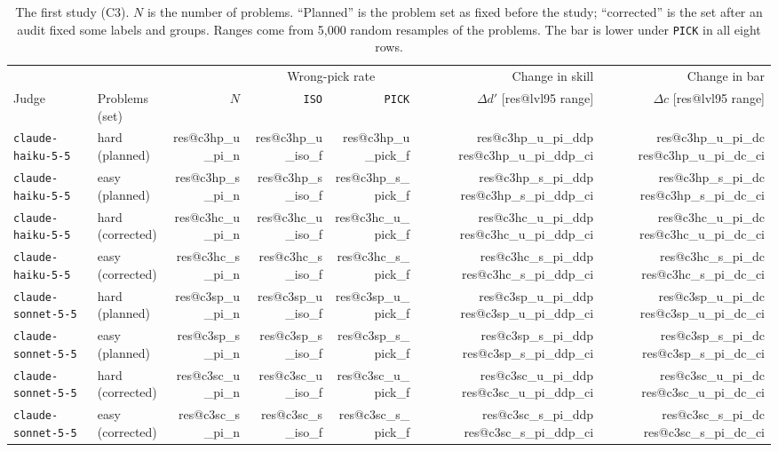 \documentclass[10pt,twocolumn]{article}
\makeatletter
\newcommand{\res}[1]{\csname res@#1\endcsname}
\makeatother
\begin{document}
\begin{table}[t]
\centering\footnotesize
\setlength{\tabcolsep}{4.5pt}
\begin{tabular}{llrrrrr}
\toprule
 & & & \multicolumn{2}{c}{Wrong-pick rate} & Change in skill & Change in bar \\
Judge & Problems (set) & $N$ & \texttt{ISO} & \texttt{PICK} & $\Delta d'$ [\res{lvl95} range] & $\Delta c$ [\res{lvl95} range] \\
\midrule
\texttt{claude-haiku-5-5} & hard (planned) & \res{c3hp_u_pi_n} & \res{c3hp_u_iso_f} & \res{c3hp_u_pick_f} & \res{c3hp_u_pi_ddp} \res{c3hp_u_pi_ddp_ci} & \res{c3hp_u_pi_dc} \res{c3hp_u_pi_dc_ci} \\
\texttt{claude-haiku-5-5} & easy (planned) & \res{c3hp_s_pi_n} & \res{c3hp_s_iso_f} & \res{c3hp_s_pick_f} & \res{c3hp_s_pi_ddp} \res{c3hp_s_pi_ddp_ci} & \res{c3hp_s_pi_dc} \res{c3hp_s_pi_dc_ci} \\
\texttt{claude-haiku-5-5} & hard (corrected) & \res{c3hc_u_pi_n} & \res{c3hc_u_iso_f} & \res{c3hc_u_pick_f} & \res{c3hc_u_pi_ddp} \res{c3hc_u_pi_ddp_ci} & \res{c3hc_u_pi_dc} \res{c3hc_u_pi_dc_ci} \\
\texttt{claude-haiku-5-5} & easy (corrected) & \res{c3hc_s_pi_n} & \res{c3hc_s_iso_f} & \res{c3hc_s_pick_f} & \res{c3hc_s_pi_ddp} \res{c3hc_s_pi_ddp_ci} & \res{c3hc_s_pi_dc} \res{c3hc_s_pi_dc_ci} \\
\midrule
\texttt{claude-sonnet-5-5} & hard (planned) & \res{c3sp_u_pi_n} & \res{c3sp_u_iso_f} & \res{c3sp_u_pick_f} & \res{c3sp_u_pi_ddp} \res{c3sp_u_pi_ddp_ci} & \res{c3sp_u_pi_dc} \res{c3sp_u_pi_dc_ci} \\
\texttt{claude-sonnet-5-5} & easy (planned) & \res{c3sp_s_pi_n} & \res{c3sp_s_iso_f} & \res{c3sp_s_pick_f} & \res{c3sp_s_pi_ddp} \res{c3sp_s_pi_ddp_ci} & \res{c3sp_s_pi_dc} \res{c3sp_s_pi_dc_ci} \\
\texttt{claude-sonnet-5-5} & hard (corrected) & \res{c3sc_u_pi_n} & \res{c3sc_u_iso_f} & \res{c3sc_u_pick_f} & \res{c3sc_u_pi_ddp} \res{c3sc_u_pi_ddp_ci} & \res{c3sc_u_pi_dc} \res{c3sc_u_pi_dc_ci} \\
\texttt{claude-sonnet-5-5} & easy (corrected) & \res{c3sc_s_pi_n} & \res{c3sc_s_iso_f} & \res{c3sc_s_pick_f} & \res{c3sc_s_pi_ddp} \res{c3sc_s_pi_ddp_ci} & \res{c3sc_s_pi_dc} \res{c3sc_s_pi_dc_ci} \\
\bottomrule
\end{tabular}
\caption{The first study (C3). $N$ is the number of problems. ``Planned'' is the problem set as fixed before the study; ``corrected'' is the set after an audit fixed some labels and groups. Ranges come from 5,000 random resamples of the problems. The bar is lower under \texttt{PICK} in all eight rows.}
\label{tab:v1sdt}
\end{table}
\end{document}
